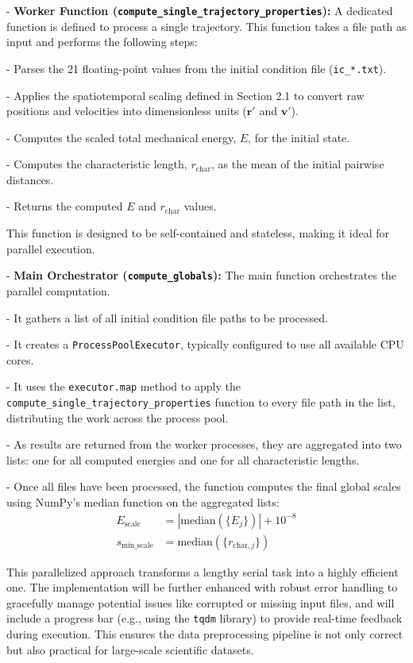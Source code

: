 - \textbf{Worker Function (\texttt{compute\_single\_trajectory\_properties}):} A dedicated function is defined to process a single trajectory. This function takes a file path as input and performs the following steps:


- Parses the 21 floating-point values from the initial condition file (\texttt{ic\_*.txt}).

- Applies the spatiotemporal scaling defined in Section 2.1 to convert raw positions and velocities into dimensionless units ($\mathbf{r}'$ and $\mathbf{v}'$).

- Computes the scaled total mechanical energy, $E$, for the initial state.

- Computes the characteristic length, $r_{\text{char}}$, as the mean of the initial pairwise distances.

- Returns the computed $E$ and $r_{\text{char}}$ values.

    This function is designed to be self-contained and stateless, making it ideal for parallel execution.


- \textbf{Main Orchestrator (\texttt{compute\_globals}):} The main function orchestrates the parallel computation.


- It gathers a list of all initial condition file paths to be processed.

- It creates a \texttt{ProcessPoolExecutor}, typically configured to use all available CPU cores.

- It uses the \texttt{executor.map} method to apply the \texttt{compute\_single\_trajectory\_properties} function to every file path in the list, distributing the work across the process pool.

- As results are returned from the worker processes, they are aggregated into two lists: one for all computed energies and one for all characteristic lengths.

- Once all files have been processed, the function computes the final global scales using NumPy's median function on the aggregated lists:
        \begin{align}
            E_{\text{scale}} &= |\text{median}(\{E_j\})| + 10^{-8} \\
            s_{\text{min\_scale}} &= \text{median}(\{r_{\text{char},j}\})
        \end{align}


This parallelized approach transforms a lengthy serial task into a highly efficient one. The implementation will be further enhanced with robust error handling to gracefully manage potential issues like corrupted or missing input files, and will include a progress bar (e.g., using the \texttt{tqdm} library) to provide real-time feedback during execution. This ensures the data preprocessing pipeline is not only correct but also practical for large-scale scientific datasets.

